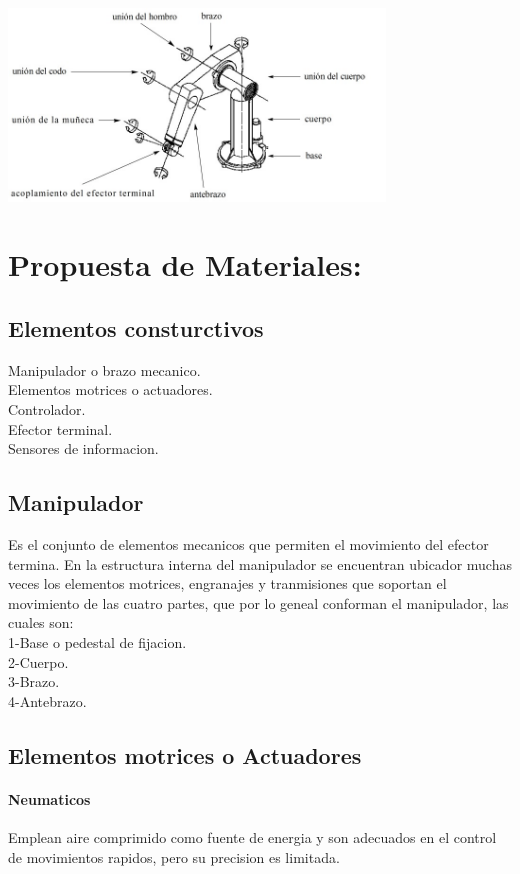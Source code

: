\documentclass[14pt,a4paper]{article}
\begin{document}
\begin{center}
\includegraphics[width=10cm]{Bosquejo.jpeg} 
\end{center}

\section{Propuesta de Materiales:}

\subsection{Elementos consturctivos}
Manipulador o brazo mecanico.\\
Elementos motrices o actuadores.\\
Controlador.\\
Efector terminal.\\
Sensores de informacion.

\subsection{Manipulador}
Es el conjunto de elementos mecanicos que permiten el movimiento del efector termina. En la estructura interna del manipulador se encuentran ubicador muchas veces los elementos motrices, engranajes y tranmisiones que soportan el movimiento de las cuatro partes, que por lo geneal conforman el manipulador, las cuales son:\\
1-Base o pedestal de fijacion.\\
2-Cuerpo.\\
3-Brazo.\\
4-Antebrazo.\\
\subsection{Elementos motrices o Actuadores}
\paragraph{Neumaticos}
Emplean aire comprimido como fuente de energia y son adecuados en el control de movimientos rapidos, pero su precision es limitada.
\end{document}
